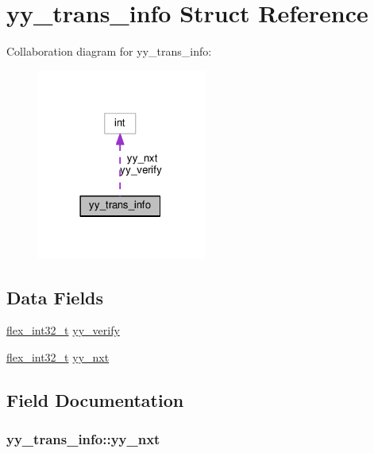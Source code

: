 \hypertarget{structyy__trans__info}{}\section{yy\+\_\+trans\+\_\+info Struct Reference}
\label{structyy__trans__info}


Collaboration diagram for yy\+\_\+trans\+\_\+info\+:
\nopagebreak
\begin{figure}[H]
\begin{center}
\leavevmode
\includegraphics[width=158pt]{structyy__trans__info__coll__graph}
\end{center}
\end{figure}
\subsection*{Data Fields}
\begin{DoxyCompactItemize}
\item 
\hyperlink{util__expr__scan_8c_a838ce943cf44ef7769480714fc6c3ba9}{flex\+\_\+int32\+\_\+t} \hyperlink{structyy__trans__info_a5c9f61e770deef50bd4e697310342fe9}{yy\+\_\+verify}
\item 
\hyperlink{util__expr__scan_8c_a838ce943cf44ef7769480714fc6c3ba9}{flex\+\_\+int32\+\_\+t} \hyperlink{structyy__trans__info_ae0715250c2bef261e596e77e0030f13e}{yy\+\_\+nxt}
\end{DoxyCompactItemize}


\subsection{Field Documentation}
\subsubsection[{\texorpdfstring{yy\+\_\+nxt}{yy_nxt}}]{ yy\+\_\+trans\+\_\+info\+::yy\+\_\+nxt}\hypertarget{structyy__trans__info_ae0715250c2bef261e596e77e0030f13e}{}\label{structyy__trans__info_ae0715250c2bef261e596e77e0030f13e}
